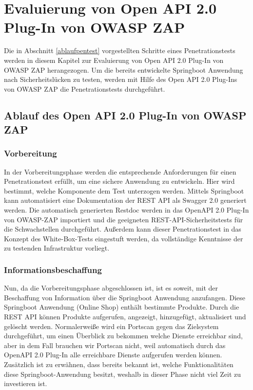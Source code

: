 \chapter{Evaluierung von Open API 2.0 Plug-In von OWASP ZAP}
\label{cha:k5}

Die in Abschnitt \ref{ablaufpentest} vorgestellten Schritte eines Penetrationstests werden in diesem Kapitel zur Evaluierung von Open API 2.0 Plug-In von OWASP ZAP herangezogen. Um die bereits entwickelte Springboot Anwendung nach Sicherheitslücken zu testen, werden mit Hilfe des Open API 2.0 Plug-Ins von OWASP ZAP die Penetrationstests durchgeführt.

\section{Ablauf des Open API 2.0 Plug-In von OWASP ZAP}

\subsection{Vorbereitung}

In der Vorbereitungsphase werden die entsprechende Anforderungen für einen Penetrationstest erfüllt, um eine sichere Anwendung zu entwickeln. Hier wird bestimmt, welche Komponente dem Test unterzogen werden. Mittels Springboot kann automatisiert eine Dokumentation der REST API als Swagger 2.0 generiert werden. Die automatisch generierten Restdoc werden in das OpenAPI 2.0 Plug-In von OWASP-ZAP importiert und die geeigneten REST-API-Sicherheitstests für die Schwachstellen durchgeführt. Außerdem kann dieser Penetrationstest in das Konzept des White-Box-Tests eingestuft werden, da vollständige Kenntnisse der zu testenden Infrastruktur vorliegt.

\subsection{Informationsbeschaffung}

Nun, da die Vorbereitungsphase abgeschlossen ist, ist es soweit, mit der Beschaffung von Information über die Springboot Anwendung anzufangen. Diese Springboot Anwendung (Online Shop) enthält bestimmte Produkte. Durch die REST API können Produkte aufgerufen, angezeigt, hinzugefügt, aktualisiert und gelöscht werden. Normalerweiße wird ein Portscan gegen das Zielsystem durchgeführt, um einen Überblick zu bekommen welche Dienste erreichbar sind, aber in dem Fall brauchen wir Portscan nicht, weil automatisch durch das OpenAPI 2.0 Plug-In alle erreichbare Dienste aufgerufen werden können.  Zusätzlich ist zu erwähnen, dass bereits bekannt ist, welche Funktionalitäten diese Springboot-Anwendung besitzt, weshalb in dieser Phase nicht viel Zeit zu investieren ist.

